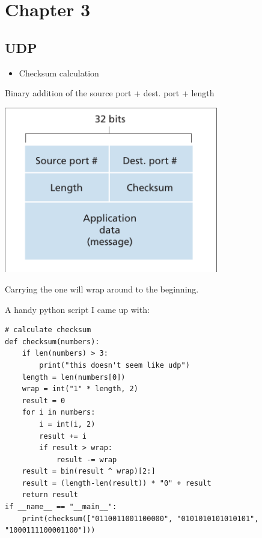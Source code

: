 \documentclass[11pt]{article}
\author{David Lewis}
\date{\today}
\title{}
\begin{document}
\setcounter{tocdepth}{2}
\tableofcontents


\section{Chapter 3}
\label{sec:org00bd418}

\subsection{UDP}
\label{sec:org02cb0a7}
\begin{itemize}
\item Checksum calculation
\end{itemize}

Binary addition of the source port + dest. port + length
\begin{center}
\includegraphics[width=0.7\textwidth]{checksum.png}
\end{center}

Carrying the one will wrap around to the beginning.

A handy python script I came up with:
\begin{verbatim}
# calculate checksum
def checksum(numbers):
    if len(numbers) > 3:
        print("this doesn't seem like udp")
    length = len(numbers[0])
    wrap = int("1" * length, 2)
    result = 0
    for i in numbers:
        i = int(i, 2)
        result += i
        if result > wrap:
            result -= wrap
    result = bin(result ^ wrap)[2:]
    result = (length-len(result)) * "0" + result
    return result
if __name__ == "__main__":
    print(checksum(["0110011001100000", "0101010101010101", "1000111100001100"]))
\end{verbatim}


\end{document}
